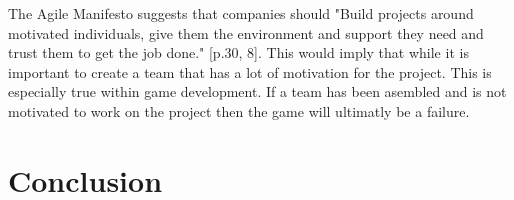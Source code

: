 \documentclass{scrartcl}
\begin{document}
The Agile Manifesto suggests that companies should "Build projects around motivated individuals, give them the environment and support they need and trust them to get the job done." [p.30, 8]. This would imply that while it is important to create a team that has a lot of motivation for the project. This is especially true within game development. If a team has been asembled and is not motivated to work on the project then the game will ultimatly be a failure.

\section{Conclusion}





\end{document}
